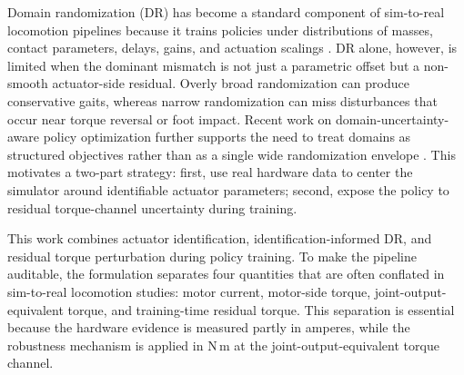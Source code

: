 \documentclass[twoside,final,1p,times]{elsarticle}
\newcommand{\minorrev}[1]{#1}
\begin{document}
Domain randomization (DR) has become a standard component of sim-to-real locomotion pipelines because it trains policies under distributions of masses, contact parameters, delays, gains, and actuation scalings \minorrev{\citep{kumar2021rma,rudin2022minutes,siekmann2021periodic,margolis2024rapid,radosavovic2024realworld,haarnoja2024agile,li2025versatile}}. DR alone, however, is limited when the dominant mismatch is not just a parametric offset but a non-smooth actuator-side residual. Overly broad randomization can produce conservative gaits, whereas narrow randomization can miss disturbances that occur near torque reversal or foot impact. Recent work on domain-uncertainty-aware policy optimization further supports the need to treat domains as structured objectives rather than as a single wide randomization envelope \minorrev{\citep{ilboudo2026domains}}. This motivates a two-part strategy: first, use real hardware data to center the simulator around identifiable actuator parameters; second, expose the policy to residual torque-channel uncertainty during training.

This work combines actuator identification, identification-informed DR, and residual torque perturbation during policy training. To make the pipeline auditable, the formulation separates four quantities that are often conflated in sim-to-real locomotion studies: motor current, motor-side torque, joint-output-equivalent torque, and training-time residual torque. This separation is essential because the hardware evidence is measured partly in amperes, while the robustness mechanism is applied in N\,m at the joint-output-equivalent torque channel.
\end{document}
